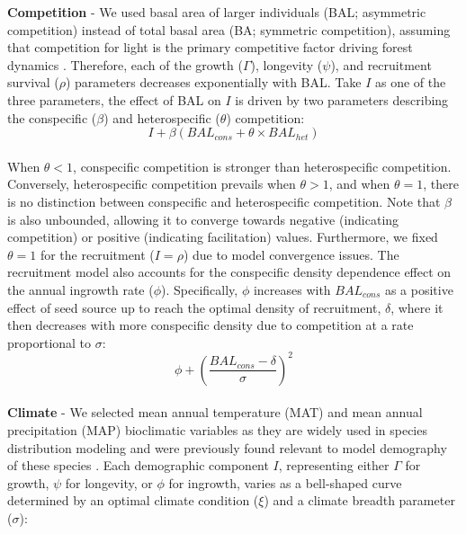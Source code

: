 \textbf{Competition} - We used basal area of larger individuals (BAL;
asymmetric competition) instead of total basal area (BA; symmetric
competition), assuming that competition for light is the primary
competitive factor driving forest dynamics \citep{Pacala1996a}.
Therefore, each of the growth (\(\Gamma\)), longevity (\(\psi\)), and
recruitment survival (\(\rho\)) parameters decreases exponentially with
BAL. Take \(I\) as one of the three parameters, the effect of BAL on
\(I\) is driven by two parameters describing the conspecific (\(\beta\))
and heterospecific (\(\theta\)) competition:\\

\begin{equation}
  I + \beta (BAL_{cons} + \theta \times BAL_{het})
\label{eq:compEffect}\end{equation}\\

When \(\theta < 1\), conspecific competition is stronger than
heterospecific competition. Conversely, heterospecific competition
prevails when \(\theta > 1\), and when \(\theta = 1\), there is no
distinction between conspecific and heterospecific competition. Note
that \(\beta\) is also unbounded, allowing it to converge towards
negative (indicating competition) or positive (indicating facilitation)
values. Furthermore, we fixed \(\theta = 1\) for the recruitment
(\(I = \rho\)) due to model convergence issues. The recruitment model
also accounts for the conspecific density dependence effect on the
annual ingrowth rate (\(\phi\)). Specifically, \(\phi\) increases with
\(BAL_{cons}\) as a positive effect of seed source up to reach the
optimal density of recruitment, \(\delta\), where it then decreases with
more conspecific density due to competition at a rate proportional to
\(\sigma\):\\

\begin{equation}
  \phi + \left(\frac{BAL_{cons} - \delta}{\sigma}\right)^2
\label{eq:compingrowth}\end{equation}\\

\textbf{Climate} - We selected mean annual temperature (MAT) and mean
annual precipitation (MAP) bioclimatic variables as they are widely used
in species distribution modeling and were previously found relevant to
model demography of these species \citep{LeSquin2021}. Each demographic
component \(I\), representing either \(\Gamma\) for growth, \(\psi\) for
longevity, or \(\phi\) for ingrowth, varies as a bell-shaped curve
determined by an optimal climate condition (\(\xi\)) and a climate
breadth parameter (\(\sigma\)):\\

